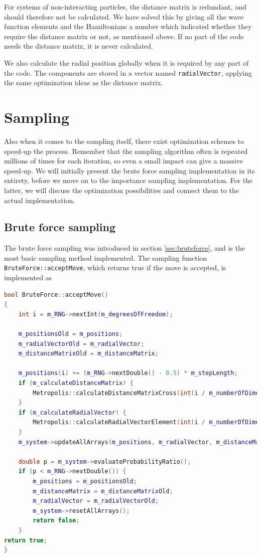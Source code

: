 For systems of non-interacting particles, the distance matrix is redundant, and should therefore not be calculated. We have solved this by giving all the wave function elements and the Hamiltonians a number which indicated whether they require the distance matrix or not, as mentioned above. If no part of the code needs the distance matrix, it is never calculated. 

We also calculate the radial position globally when it is required by any part of the code. The components are stored in a vector named \lstinline{radialVector}, applying the same optimization ideas as the distance matrix. 

\section{Sampling} \label{sec:sampling}
Also when it comes to the sampling itself, there exist optimization schemes to speed-up the process. Remember that the sampling algorithm often is repeated millions of times for each iteration, so even a small impact can give a massive speed-up. We will initially present the brute force sampling implementation in its entirety, before we move on to the importance sampling implementation. For the latter, we will discuss the optimization possibilities and connect them to the actual implementation.

\subsection{Brute force sampling}
The brute force sampling was introduced in section \ref{sec:bruteforce}, and is the most basic sampling method implemented. The sampling function \lstinline{BruteForce::acceptMove}, which returns true if the move is accepted, is implemented as

\begin{lstlisting}[language=c++,caption={Taken from \lstinline{bruteforce.cpp}.}]
bool BruteForce::acceptMove()
{
	int i = m_RNG->nextInt(m_degreesOfFreedom);

	m_positionsOld = m_positions;
	m_radialVectorOld = m_radialVector;
	m_distanceMatrixOld = m_distanceMatrix;

	m_positions(i) += (m_RNG->nextDouble() - 0.5) * m_stepLength;
	if (m_calculateDistanceMatrix) {
		Metropolis::calculateDistanceMatrixCross(int(i / m_numberOfDimensions));
	}
	if (m_calculateRadialVector) {
		Metropolis::calculateRadialVectorElement(int(i / m_numberOfDimensions));
	}
	m_system->updateAllArrays(m_positions, m_radialVector, m_distanceMatrix, i);

	double p = m_system->evaluateProbabilityRatio();
	if (p < m_RNG->nextDouble()) {
		m_positions = m_positionsOld;
		m_distanceMatrix = m_distanceMatrixOld;
		m_radialVector = m_radialVectorOld;
		m_system->resetAllArrays();
		return false;
	}
return true;
}
\end{lstlisting}

